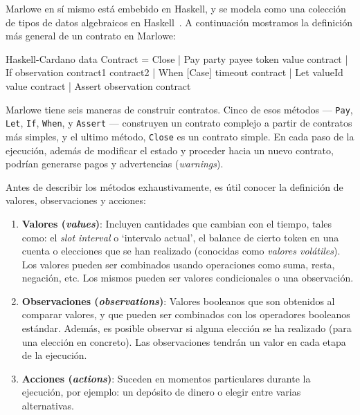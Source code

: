 \documentclass[12pt]{book}
\begin{document}
Marlowe en sí mismo está embebido en Haskell, y se modela como una colección de tipos de datos algebraicos en Haskell~\cite{Algebraic_data_type}. A continuación mostramos la definición más general de un contrato en Marlowe:

\begin{code}[title=Tipos de contratos en Marlowe.]{Haskell-Cardano}
data Contract = Close
              | Pay party payee token value contract
              | If observation contract1 contract2
              | When [Case] timeout contract
              | Let valueId value contract
              | Assert observation contract
\end{code}

Marlowe tiene seis maneras de construir contratos. Cinco de esos métodos ---
\texttt{Pay}, \texttt{Let}, \texttt{If}, \texttt{When}, y \texttt{Assert} --- construyen un contrato complejo a partir de contratos más simples, y el ultimo método, \texttt{Close} es un contrato simple. En cada paso de la ejecución, además de modificar el estado y proceder hacia un nuevo contrato, podrían generarse pagos y advertencias (\textit{warnings}).

Antes de describir los métodos exhaustivamente, es útil conocer la definición de valores, observaciones y acciones:

\begin{enumerate}
    \item \textbf{Valores (\textit{values})}: Incluyen cantidades que cambian con el tiempo, tales como: el \textit{slot interval} o `intervalo actual', el balance de cierto token en una cuenta o elecciones que se han realizado (conocidas como \textit{valores volátiles}). Los valores pueden ser combinados usando operaciones como suma, resta, negación, etc. Los mismos pueden ser valores condicionales o una observación.

	\item \textbf{Observaciones (\textit{observations})}: Valores booleanos que son obtenidos al comparar valores, y que pueden ser combinados con los operadores booleanos estándar. Además, es posible observar si alguna elección se ha realizado (para una elección en concreto). Las observaciones tendrán un valor en cada etapa de la ejecución.

	\item \textbf{Acciones (\textit{actions})}: Suceden en momentos particulares durante la ejecución, por ejemplo: un depósito de dinero o elegir entre varias alternativas.
\end{enumerate}
\end{document}
